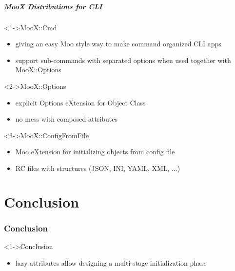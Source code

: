 \documentclass[ngerman,xcolor={table,dvipsnames},scriptsizeer,compress,hyperref={bookmarks,colorlinks}]{beamer}
\begin{document}
\begin{frame}[t,fragile]
\frametitle{MooX Distributions for CLI}

\begin{block}<1->{MooX::Cmd}
\begin{itemize}
\item giving an easy Moo style way to make command organized CLI apps
\item support sub-commands with separated options when used together with MooX::Options
\end{itemize}
\end{block}

\begin{block}<2->{MooX::Options}
\begin{itemize}
\item explicit Options eXtension for Object Class
\item no mess with composed attributes
\end{itemize}
\end{block}

\begin{block}<3->{MooX::ConfigFromFile}
\begin{itemize}
\item Moo eXtension for initializing objects from config file
\item RC files with structures (JSON, INI, YAML, XML, ...)
\end{itemize}
\end{block}

\end{frame}



\part{Conclusion}

\section{Conclusion}

\begin{frame}[t,fragile]

\begin{block}<1->{Conclusion}
\begin{itemize}
\item lazy attributes allow designing a multi-stage initialization phase
\end{itemize}
\end{block}

\end{frame}
\end{document}

